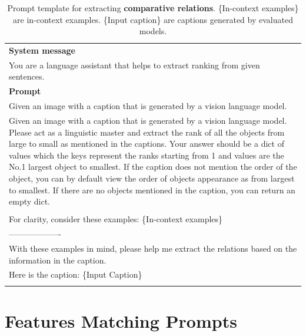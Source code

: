 \begin{table}[h!]\centering
\begin{minipage}{0.95\textwidth}  
\centering
\begin{tcolorbox} 
    \centering
    \small
    \begin{tabular}{p{}}
   { {\bf System message} } \\
You are a language assistant that helps to extract ranking from given sentences. \\
    \midrule
    {\bf Prompt}  \\
Given an image with a caption that is generated by a vision language model. \\
             Given an image with a caption that is generated by a vision language model. 
        Please act as a linguistic master and extract the rank of all the objects from large to small as mentioned in the captions.
        Your answer should be a dict of values which the keys represent the ranks starting from 1 and values are the No.1 largest object to smallest.
        If the caption does not mention the order of the object, you can by default view the order of objects appearance as from largest to smallest.
        If there are no objects mentioned in the caption, you can return an empty dict. \\\\
        For clarity, consider these examples: \textcolor[rgb]{0,0.7,0}{ \{In-context examples\} } \\
------------------- \\
With these examples in mind, please help me extract the relations based on the information in the caption.\\
        Here is the caption: 
\textcolor[rgb]{0.8,0,0}{\{Input Caption\}} \\
\\

    \end{tabular}
\end{tcolorbox}
\caption{Prompt template for extracting \textbf{comparative relations}. \textcolor[rgb]{0,0.7,0}{ \{In-context examples\} } are in-context examples. \textcolor[rgb]{0.8,0,0}{\{Input caption\}} are captions generated by evaluated models.}
    \label{tab:extraction_comparative}
\end{minipage}
\end{table}

\section{Features Matching Prompts}
\label{apx:features_matching_prompts}

